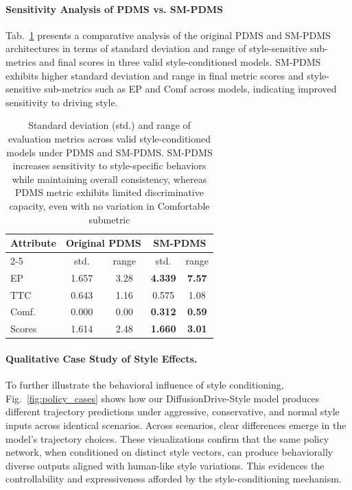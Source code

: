 \documentclass{article}
\begin{document}
\paragraph{Sensitivity Analysis of PDMS vs. SM-PDMS}
Tab.~\ref{tab:sm_pdms_std_range} presents a comparative analysis of the original PDMS and SM-PDMS architectures in terms of standard deviation and range of style-sensitive sub-metrics and final scores in three valid style-conditioned models. SM-PDMS exhibits higher standard deviation and range in final metric scores and style-sensitive sub-metrics such as EP and Comf across models, indicating improved sensitivity to driving style.

\begin{table}[htbp]
  \centering
  \caption{Standard deviation (std.) and range of evaluation metrics across valid style-conditioned models under PDMS and SM-PDMS. SM-PDMS increases sensitivity to style-specific behaviors while maintaining overall consistency, whereas PDMS metric exhibits limited discriminative capacity, even with no variation in Comfortable submetric}
  \setlength{\tabcolsep}{1mm}
  \begin{tabular}{l|cc|cc}
    \hline
    \hline
    \multirow{2}{*}{Attribute} & \multicolumn{2}{c|}{Original PDMS} & \multicolumn{2}{c}{SM-PDMS} \\
    \cline{2-5}
    & std. & range & std. & range \\
    \hline
    EP       & 1.657 & 3.28 & \textbf{4.339} & \textbf{7.57} \\
    TTC      & 0.643 & 1.16 & 0.575 & 1.08 \\
    Comf.     & 0.000 & 0.00 & \textbf{0.312} & \textbf{0.59} \\
    \hline
    Scores  & 1.614 & 2.48 & \textbf{1.660} & \textbf{3.01} \\
    \hline
    \hline
  \end{tabular}
  \label{tab:sm_pdms_std_range}
\end{table}

\paragraph{Qualitative Case Study of Style Effects.}
To further illustrate the behavioral influence of style conditioning, Fig.~\ref{fig:policy_cases} shows how our DiffusionDrive-Style model produces different trajectory predictions under aggressive, conservative, and normal style inputs across identical scenarios. Across scenarios, clear differences emerge in the model's trajectory choices. These visualizations confirm that the same policy network, when conditioned on distinct style vectors, can produce behaviorally diverse outputs aligned with human-like style variations. This evidences the controllability and expressiveness afforded by the style-conditioning mechanism.
\end{document}
